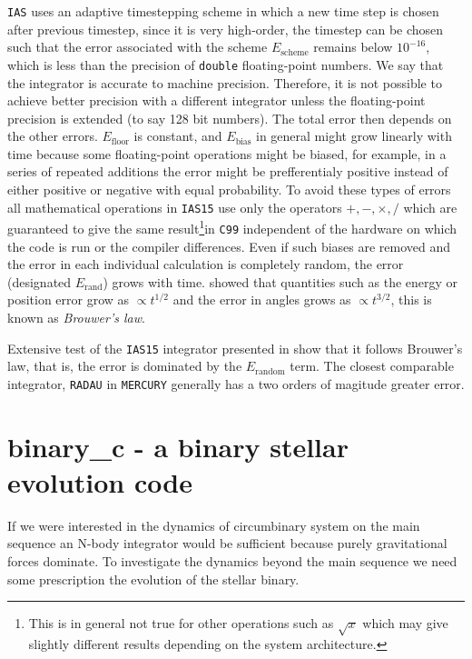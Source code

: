 \documentclass[ twoside,openright,titlepage,numbers=noenddot,headinclude,%
                footinclude=true,cleardoublepage=empty,abstractoff, %
                BCOR=5mm,paper=a4,fontsize=11pt,%
                american,%
                ]{scrreprt}
\begin{document}
\texttt{IAS} uses an adaptive timestepping scheme in which a new time
step is chosen after previous timestep, since it is very high-order, the 
timestep can be chosen such that the error associated with the scheme
$E_\text{scheme}$ remains below $10^{-16}$, which is less than the precision
of \texttt{double} floating-point numbers. We say that the integrator is
accurate to machine precision. Therefore, it is not possible to achieve
better precision with a different integrator unless the floating-point 
precision is extended (to say 128 bit numbers). 
The total error then depends on the other errors. $E_\text{floor}$ is constant,
and $E_\text{bias}$ in general might grow linearly with time because
some floating-point operations might be biased, for example, in a series
of repeated additions the error might be prefferentialy positive instead of
either positive or negative with equal probability. To avoid these types of
errors all mathematical operations in \texttt{IAS15} use only the operators
$+,-,\times,/$ which are guaranteed to give the same result\footnote{This is 
in general not true for other operations such as $\sqrt{x}$ which may give 
slightly different results depending on the system architecture.}in \texttt{C99}
independent of the hardware on which the code is run or the compiler differences.
Even if such biases are removed and the error in each individual calculation is
completely random, the error (designated $E_\text{rand}$) grows with time. 
\cite{brouwer} showed that  quantities such as the energy  or position error
grow as $\propto t^{1/2}$ and the error in angles grows as $\propto t^{3/2}$,
this is known as \emph{Brouwer's law}.

Extensive test of the \texttt{IAS15} integrator presented in \cite{Rein2014} 
show that it follows Brouwer's law, that is, the error is dominated by the 
$E_\text{random}$ term. The closest comparable integrator, \texttt{RADAU}
in \texttt{MERCURY} generally has a two orders of magitude greater error. 

\section{binary\_c - a binary stellar evolution code}
\label{sec:binary_c - a binary stellar evolution code}
If we were interested in the dynamics of circumbinary system on the main 
sequence an N-body integrator would be sufficient because purely gravitational
forces dominate. To investigate the dynamics beyond the main sequence we 
need some prescription the evolution of the stellar binary. 
\end{document}
